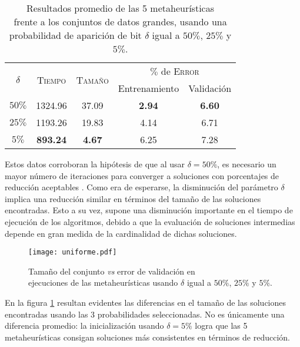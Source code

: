 \begin{table}[h!]
\centering
\begin{tabular}{c c c c c}
\hline
\multirow{2}{*}{$\delta$}
	& \multirow{2}{*}{\textsc{Tiempo}}
	& \multirow{2}{*}{\textsc{Tamaño}}
	& \multicolumn{2}{c}{$\%$ de \textsc{Error}} \\\cline{4-5}
 & & & \scriptsize{Entrenamiento} & \scriptsize{Validación} \\
\hline
\hline
$50\%$ & 1324.96 & 37.09 & \textbf{2.94} & \textbf{6.60} \\
$25\%$ & 1193.26 & 19.83 & 4.14 & 6.71 \\
$5\%$  & \textbf{893.24} & \textbf{4.67} & 6.25 & 7.28 \\
\hline
\end{tabular}
\caption[Resultados modificando la probabilidad de aparición de bit]{Resultados promedio de las 5 metaheurísticas\\frente a los conjuntos de datos grandes, usando una\\probabilidad de aparición de bit $\delta$ igual a $50\%$, $25\%$ y $5\%$.}
\label{table-unif}
\end{table}

Estos datos corroboran la hipótesis de que al usar $\delta = 50\%$, es necesario un mayor número de iteraciones para converger a soluciones con porcentajes de reducción aceptables \cite{cano2003using}. Como era de esperarse, la disminución del parámetro $\delta$ implica una reducción similar en términos del tamaño de las soluciones encontradas. Esto a su vez, supone una disminución importante en el tiempo de ejecución de los algoritmos, debido a que la evaluación de soluciones intermedias depende en gran medida de la cardinalidad de dichas soluciones.

\begin{figure}[h!]
\centering
\texttt{[image: uniforme.pdf]}
\caption[Tamaño \emph{vs} error de validación modificando $\delta$]{Tamaño del conjunto \emph{vs} error de validación en\\ejecuciones de las metaheurísticas usando $\delta$ igual a $50\%$, $25\%$ y $5\%$.}
\label{fig-unif}
\end{figure}

En la figura \ref{fig-unif} resultan evidentes las diferencias en el tamaño de las soluciones encontradas usando las 3 probabilidades seleccionadas. No es únicamente una diferencia promedio: la inicialización usando $\delta = 5\%$ logra que las 5 metaheurísticas consigan soluciones más consistentes en términos de reducción.


